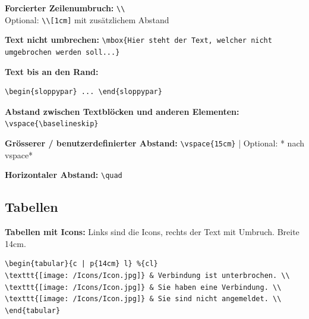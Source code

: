 \vspace{\baselineskip}

\textbf{Forcierter Zeilenumbruch:} \verb+\\+\\
Optional: \verb+\\[1cm]+ mit zusätzlichem Abstand

\vspace{\baselineskip}

\textbf{Text nicht umbrechen:}
\verb+\mbox{Hier steht der Text, welcher nicht umgebrochen werden soll...}+

\vspace{\baselineskip}

\textbf{Text bis an den Rand:}

\begin{verbatim}
\begin{sloppypar} ... \end{sloppypar}
\end{verbatim}

\vspace{\baselineskip}

\textbf{Abstand zwischen Textblöcken und anderen Elementen:} \verb+\vspace{\baselineskip}+

\vspace{\baselineskip}

\textbf{Grösserer / benutzerdefinierter Abstand:} \verb+\vspace{15cm}+ | Optional: * nach vspace*

\vspace{\baselineskip}

\textbf{Horizontaler Abstand:} \verb+\quad+





\subsection{Tabellen}

\textbf{Tabellen mit Icons:}
Links sind die Icons, rechts der Text mit Umbruch. Breite 14cm.

\begin{verbatim}
\begin{tabular}{c | p{14cm} l} %{cl}
\texttt{[image: /Icons/Icon.jpg]} & Verbindung ist unterbrochen. \\
\texttt{[image: /Icons/Icon.jpg]} & Sie haben eine Verbindung. \\
\texttt{[image: /Icons/Icon.jpg]} & Sie sind nicht angemeldet. \\
\end{tabular}
\end{verbatim}

